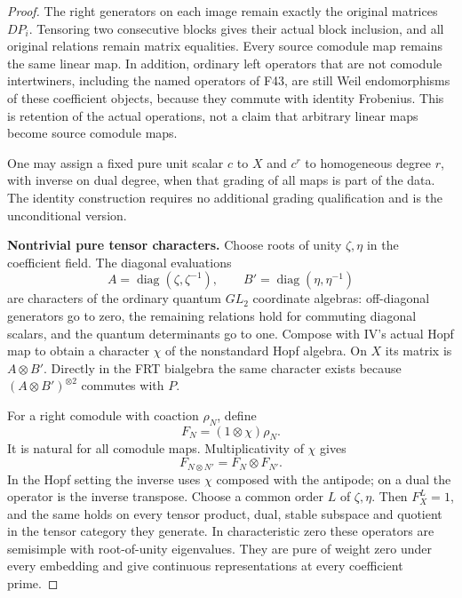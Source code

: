 \documentclass[11pt,a4paper]{article}
\newcommand{\fid}[1]{\textsf{#1}}\newcommand{\gate}[1]{\textsf{#1}}
\theoremstyle{named}\newtheorem{finding}{Finding}[section]
\theoremstyle{definition}\newtheorem{definition}[finding]{Definition}
\theoremstyle{remark}\newtheorem{remark}[finding]{Remark}
\begin{document}
\begin{proof}
The right generators on each image remain exactly the
original matrices $DP_i$. Tensoring two consecutive blocks
gives their actual block inclusion, and all original
relations remain matrix equalities.
Every source comodule map remains the same linear map.
In addition, ordinary left operators that are not comodule
intertwiners, including the named operators of \fid{F43},
are still Weil endomorphisms of these coefficient objects,
because they commute with identity Frobenius.
This is retention of the actual operations, not a claim
that arbitrary linear maps become source comodule maps.

One may assign a fixed pure unit scalar $c$ to $X$ and
$c^r$ to homogeneous degree $r$, with inverse on dual
degree, when that grading of all maps is part of the
data. The identity construction requires no additional
grading qualification and is the unconditional version.

\par\smallskip\noindent\textbf{Nontrivial pure tensor characters.}\quad
Choose roots of unity $\zeta,\eta$ in the coefficient field.
The diagonal evaluations
\[
 A=\operatorname{diag}(\zeta,\zeta^{-1}),\qquad
 B'=\operatorname{diag}(\eta,\eta^{-1})
\]
are characters of the ordinary quantum $GL_2$ coordinate
algebras: off-diagonal generators go to zero, the remaining
relations hold for commuting diagonal scalars, and the
quantum determinants go to one. Compose with IV's actual
Hopf map to obtain a character $\chi$ of the nonstandard
Hopf algebra. On $X$ its matrix is $A\otimes B'$.
Directly in the FRT bialgebra the same character exists
because $(A\otimes B')^{\otimes2}$ commutes with $P$.

For a right comodule with coaction $\rho_N$, define
\[
 F_N=(1\otimes\chi)\rho_N.
\]
It is natural for all comodule maps. Multiplicativity of
$\chi$ gives
\[
 F_{N\otimes N'}=F_N\otimes F_{N'}.
\]
In the Hopf setting the inverse uses $\chi$ composed with
the antipode; on a dual the operator is the inverse
transpose. Choose a common order $L$ of $\zeta,\eta$.
Then $F_X^L=1$, and the same holds on every tensor product,
dual, stable subspace and quotient in the tensor category
they generate. In characteristic zero these operators
are semisimple with root-of-unity eigenvalues.
They are pure of weight zero under every embedding and
give continuous representations at every coefficient prime.


\end{proof}
\end{document}
